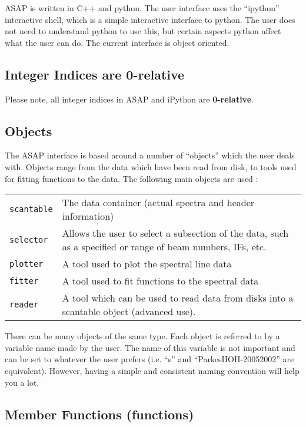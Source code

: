 \documentclass[11pt]{article}
\newcommand{\cmd}[1]{{\tt #1}}
\begin{document}
ASAP is written in C++ and python. The user interface
uses the ``ipython'' interactive shell, which is a simple interactive
interface to python. The user does not need to understand python to
use this, but certain aspects python affect what the user can do.  The
current interface is object oriented.

\subsection {Integer Indices are 0-relative}

Please note, all integer indices in ASAP and iPython are {\bf 0-relative}.

\subsection{Objects}
The ASAP interface is based around a number of ``objects'' which the
user deals with. Objects range from the data which have been read from
disk, to tools used for fitting functions to the data. The following
main objects are used :

\begin{tabular}{ll}

\cmd{scantable} & \parbox[t]{0.7\textwidth}{The data container (actual
  spectra and header information)} \\
\cmd{selector} & \parbox[t]{0.80\textwidth}{Allows the user to select
  a subsection of the data, such as a specified or range of beam
  numbers, IFs, etc.} \\
\cmd{plotter} & A tool used to plot the spectral line data \\
\cmd{fitter} & A tool used to fit functions to the spectral data \\
\cmd{reader} & \parbox[t]{0.8\textwidth}{A tool which can be used to
    read data from disks into a scantable object (advanced use).}\\
\end{tabular}

There can be many objects of the same type. Each object is referred to
by a variable name made by the user. The name of this variable is not
important and can be set to whatever the user prefers (i.e. ``s'' and
``ParkesHOH-20052002'' are equivalent).  However, having a simple and
consistent naming convention will help you a lot.

\subsection{Member Functions (functions)}
\end{document}
